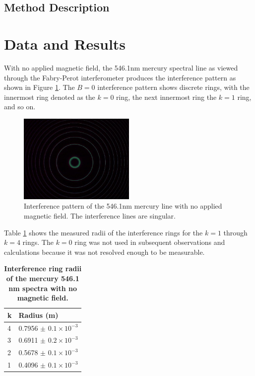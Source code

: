\documentclass[twocolumn]{article}
\begin{document}
	\subsection{Method Description} \label{subsec:MethodDescription}
	
\section{Data and Results} \label{sec:DataAndResults}
	 
	 With no applied magnetic field, the 546.1nm mercury spectral line as viewed through the Fabry-Perot interferometer produces the interference pattern as shown in Figure \ref{fig:B=0Pattern}.
	 The $B=0$ interference pattern shows discrete rings, with the innermost ring denoted as the $k=0$ ring, the next innermost ring the $k=1$ ring, and so on.
	 
	 \begin{figure}
	 	\centering
	 	\includegraphics[width=0.5\textwidth]{Images/B=0Pattern}
	 	\caption{Interference pattern of the 546.1nm mercury line with no applied magnetic field. The interference lines are singular.}
	 	\label{fig:B=0Pattern}
	 \end{figure}
	 
	 Table \ref{tab:B0Data} shows the measured radii of the interference rings for the $k=1$ through $k=4$ rings.
	 The $k=0$ ring was not used in subsequent observations and calculations because it was not resolved enough to be measurable.
	 
	 \begin{table}[h]
	 	\centering
	 	\begin{tabular}{l|l}
	 		k & Radius (m) \\ \hline
	 		4 & 0.7956 $\pm$ $0.1\times10^{-3}$    \\
	 		3 & 0.6911 $\pm$ $0.2\times10^{-3}$    \\
	 		2 & 0.5678 $\pm$ $0.1\times10^{-3}$    \\
	 		1 & 0.4096 $\pm$ $0.1\times10^{-3}$   
	 	\end{tabular}
	 	\caption{\textbf{Interference ring radii of the mercury 546.1 nm spectra with no magnetic field.}}
	 	\label{tab:B0Data}
	 \end{table}
	 
\end{document}
